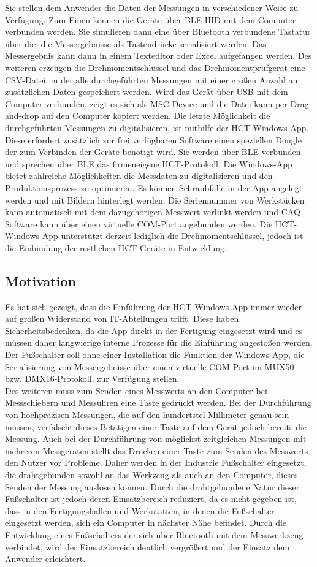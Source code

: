 Sie stellen dem Anwender die Daten der Messungen in verschiedener Weise zu Verfügung. Zum Einen können die Geräte über BLE-HID mit dem Computer verbunden werden. Sie simulieren dann eine über Bluetooth verbundene Tastatur über die, die Messergebnisse als Tastendrücke serialisiert werden. Das Messergebnis kann dann in einem Texteditor oder Excel aufgefangen werden. Des weiteren erzeugen die Drehmomentschlüssel und das Drehmomentprüfgerät eine CSV-Datei, in der alle durchgeführten Messungen mit einer großen Anzahl an zusätzlichen Daten gespeichert werden. Wird das Gerät über USB mit dem Computer verbunden, zeigt es sich als MSC-Device und die Datei kann per Drag-and-drop auf den Computer kopiert werden. Die letzte Möglichkeit die durchgeführten Messungen zu digitalisieren, ist mithilfe der HCT-Windows-App. Diese erfordert zusätzlich zur frei verfügbaren Software einen speziellen Dongle der zum Verbinden der Geräte benötigt wird. Sie werden über BLE verbunden und sprechen über BLE das firmeneigene HCT-Protokoll. Die Windows-App bietet zahlreiche Möglichkeiten die Messdaten zu digitalisieren und den Produktionsprozess zu optimieren. Es können Schraubfälle in der App angelegt werden und mit Bildern hinterlegt werden. Die Seriennummer von Werkstücken kann automatisch mit dem dazugehörigen Messwert verlinkt werden und CAQ-Software kann über einen virtuelle COM-Port angebunden werden. Die HCT-Windows-App unterstützt derzeit lediglich die Drehmomentschlüssel, jedoch ist die Einbindung der restlichen HCT-Geräte in Entwicklung.

\subsection{Motivation}
Es hat sich gezeigt, dass die Einführung der HCT-Windows-App immer wieder auf großen Widerstand von IT-Abteilungen trifft. Diese haben Sicherheitsbedenken, da die App direkt in der Fertigung eingesetzt wird und es müssen daher langwierige interne Prozesse für die Einführung angestoßen werden. Der Fußschalter soll ohne einer Installation die Funktion der Windows-App, die Serialisierung von Messergebnisse über einen virtuelle COM-Port im MUX50 bzw. DMX16-Protokoll, zur Verfügung stellen. \\
Des weiteren muss zum Senden eines Messwerts an den Computer bei Messschiebern und Messuhren eine Taste gedrückt werden. Bei der Durchführung von hochpräzisen Messungen, die auf den hundertstel Millimeter genau sein müssen, verfälscht dieses Betätigen einer Taste auf dem Gerät jedoch bereits die Messung. Auch bei der Durchführung von möglichst zeitgleichen Messungen mit mehreren Messgeräten stellt das Drücken einer Taste zum Senden des Messwerts den Nutzer vor Probleme. Daher werden in der Industrie Fußschalter eingesetzt, die drahtgebunden sowohl an das Werkzeug als auch an den Computer, dieses Senden der Messung auslösen können. Durch die drahtgebundene Natur dieser Fußschalter ist jedoch deren Einsatzbereich reduziert, da es nicht gegeben ist, dass in den Fertigungshallen und Werkstätten, in denen die Fußschalter eingesetzt werden, sich ein Computer in nächster Nähe befindet. Durch die Entwicklung eines Fußschalters der sich über Bluetooth mit dem Messwerkzeug verbindet, wird der Einsatzbereich deutlich vergrößert und der Einsatz dem Anwender erleichtert.